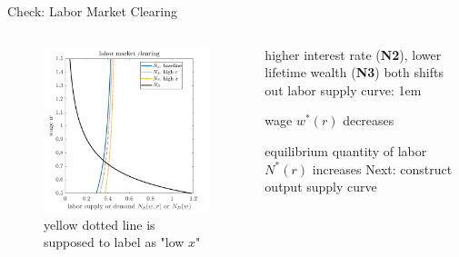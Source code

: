 \documentclass[11pt,aspectratio=43]{beamer}
\let\olditemize=\itemize
\let\endolditemize=\enditemize
\renewenvironment{itemize}{\olditemize \itemsep1em}{\endolditemize}
\theoremstyle{definition}
\begin{document}
\begin{frame}{Check: Labor Market Clearing}
\label{slide:Check__Labor_Market_Clearing}
    \begin{columns}
        \begin{column}{0.5\textwidth}
            \begin{figure}
                \caption{yellow dotted line is supposed to label as "low $ x $"}
                \includegraphics[width=\textwidth]{./figures/LaborMarketClear.png}
            \end{figure}
        \end{column}
        \begin{column}{0.5\textwidth}
            higher interest rate (\textbf{N2}), lower lifetime wealth (\textbf{N3}) both shifts out labor supply curve:
            \begin{itemize}
                \item wage $ w^{*}( r ) $ decreases
                \item equilibrium quantity of labor $ N^{*}( r ) $ increases
            \end{itemize}
            Next: construct output supply curve
        \end{column}
    \end{columns}
\end{frame}
\end{document}
